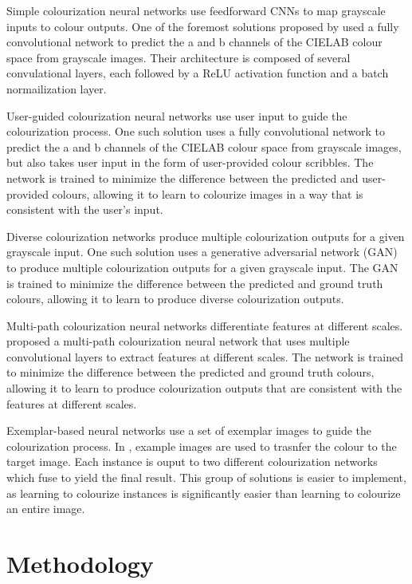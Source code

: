 \documentclass{article} %
\begin{document}
Simple colourization neural networks use feedforward CNNs to map grayscale inputs to colour outputs. One of the foremost solutions proposed by 
\cite{zhang2016colorful} used a fully convolutional network to predict the a and b channels of the CIELAB colour space from grayscale images. Their 
architecture is composed of several convulational layers, each followed by a ReLU activation function and a batch normailization layer.

User-guided colourization neural networks use user input to guide the colourization process. One such solution \cite{zhang2017real} uses a
fully convolutional network to predict the a and b channels of the CIELAB colour space from grayscale images, but also takes user input in the form of
user-provided colour scribbles. The network is trained to minimize the difference between the predicted and user-provided colours, allowing it to
learn to colourize images in a way that is consistent with the user's input. 

Diverse colourization networks produce multiple colourization outputs for a given grayscale input. One such solution \cite{Vitoria2020ChromaGAN} uses
a generative adversarial network (GAN) to produce multiple colourization outputs for a given grayscale input. The GAN is trained to minimize the difference
between the predicted and ground truth colours, allowing it to learn to produce diverse colourization outputs. 

Multi-path colourization neural networks differentiate features at different scales. \cite{Iizuka2016Colourization} proposed a multi-path
colourization neural network that uses multiple convolutional layers to extract features at different scales. The network is trained to minimize the difference
between the predicted and ground truth colours, allowing it to learn to produce colourization outputs that are consistent with the features at different scales. 

Exemplar-based neural networks use a set of exemplar images to guide the colourization process. In \cite{su2020instanceawareimagecolorization}, example images are
used to trasnfer the colour to the target image. Each instance is ouput to two different colourization networks which fuse to yield the final result. This group of 
solutions is easier to implement, as learning to colourize instances is significantly easier than learning to colourize an entire image. 

\section{Methodology}
\label{methodology}
\end{document}
